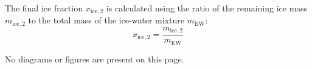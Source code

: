 The final ice fraction \( x_{\text{ice},2} \) is calculated using the ratio of the remaining ice mass \( m_{\text{ice},2} \) to the total mass of the ice-water mixture \( m_{\text{EW}} \):  
\[
x_{\text{ice},2} = \frac{m_{\text{ice},2}}{m_{\text{EW}}}
\]  

No diagrams or figures are present on this page.